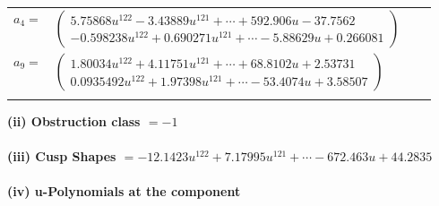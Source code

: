 \documentclass[1p]{elsarticle_modified}
\theoremstyle{definition}
\begin{document}
\begin{tabular}{m{7pt} m{180pt} m{7pt} m{180pt} }
\flushright $a_{4}=$&$\begin{pmatrix}5.75868 u^{122}-3.43889 u^{121}+\cdots+592.906 u-37.7562\\-0.598238 u^{122}+0.690271 u^{121}+\cdots-5.88629 u+0.266081\end{pmatrix}$ \\
\flushright $a_{9}=$&$\begin{pmatrix}1.80034 u^{122}+4.11751 u^{121}+\cdots+68.8102 u+2.53731\\0.0935492 u^{122}+1.97398 u^{121}+\cdots-53.4074 u+3.58507\end{pmatrix}$\\&\end{tabular}
\flushleft \textbf{(ii) Obstruction class $= -1$}\\~\\
\flushleft \textbf{(iii) Cusp Shapes $= -12.1423 u^{122}+7.17995 u^{121}+\cdots-672.463 u+44.2835$}\\~\\
\newpage\renewcommand{\arraystretch}{1}
\flushleft \textbf{(iv) u-Polynomials at the component}\newline \\
\end{document}
